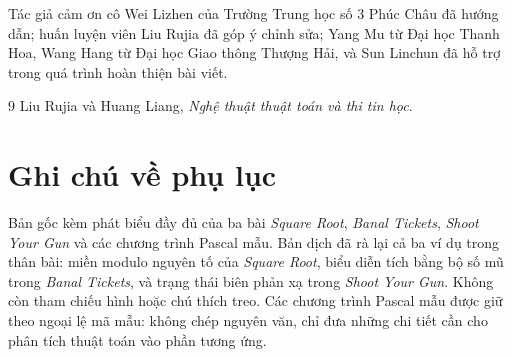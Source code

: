 \documentclass[11pt]{article}
\begin{document}
Tác giả cảm ơn cô Wei Lizhen của Trường Trung học số 3 Phúc Châu đã hướng dẫn;
huấn luyện viên Liu Rujia đã góp ý chỉnh sửa; Yang Mu từ Đại học Thanh Hoa,
Wang Hang từ Đại học Giao thông Thượng Hải, và Sun Linchun đã hỗ trợ trong quá
trình hoàn thiện bài viết.

\begin{thebibliography}{9}
Liu Rujia và Huang Liang, \textit{Nghệ thuật thuật toán và thi tin học}.
\end{thebibliography}

\section*{Ghi chú về phụ lục}

Bản gốc kèm phát biểu đầy đủ của ba bài \textit{Square Root},
\textit{Banal Tickets}, \textit{Shoot Your Gun} và các chương trình Pascal mẫu.
Bản dịch đã rà lại cả ba ví dụ trong thân bài: miền modulo nguyên tố của
\textit{Square Root}, biểu diễn tích bằng bộ số mũ trong \textit{Banal
Tickets}, và trạng thái biên phản xạ trong \textit{Shoot Your Gun}. Không còn
tham chiếu hình hoặc chú thích treo. Các chương trình Pascal mẫu được giữ theo
ngoại lệ mã mẫu: không chép nguyên văn, chỉ đưa những chi tiết cần cho phân
tích thuật toán vào phần tương ứng.
\end{document}
